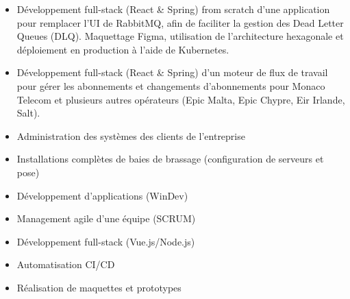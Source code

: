 \documentclass[10pt,a4paper,ragged2e,withhyper]{altacv}
\begin{document}

\makecvheader


\begin{paracol}{2}


\begin{itemize}
    \item Développement full-stack (React \& Spring) from scratch d'une application pour remplacer l'UI de RabbitMQ, afin de faciliter la gestion des Dead Letter Queues (DLQ). Maquettage Figma, utilisation de l'architecture hexagonale et déploiement en production à l'aide de Kubernetes.
    \item Développement  full-stack (React \& Spring) d'un moteur de flux de travail pour gérer les abonnements et changements d’abonnements pour Monaco Telecom et plusieurs autres opérateurs (Epic Malta, Epic Chypre, Eir Irlande, Salt).
\end{itemize}

\divider

\begin{itemize}
    \item Administration des systèmes des clients de l'entreprise
    \item Installations complètes de baies de brassage (configuration de serveurs et pose)
    \item Développement d'applications (WinDev)
\end{itemize}


\begin{itemize}
    \item Management agile d'une équipe (SCRUM)
    \item Développement full-stack (Vue.js/Node.js)
    \item Automatisation CI/CD
    \item Réalisation de maquettes et prototypes
\end{itemize}


\end{paracol}
\end{document}
